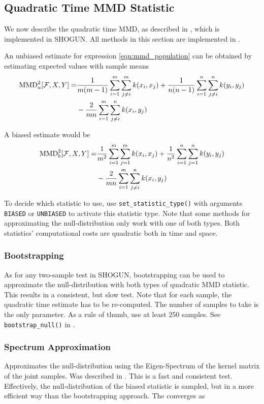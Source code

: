 \subsection{Quadratic Time MMD Statistic}
\label{sec:mmd_quadratic}
We now describe the quadratic time MMD, as described in \citep[Lemma 6]{Gretton2012}, which is implemented in SHOGUN. All methods in this section are implemented in .

An unbiased estimate for expression \ref{eqn:mmd_population} can be obtained by estimating expected values with sample means
\begin{align*}
\operatorname{MMD}_u^2[\mathcal{F},X,Y]=&\frac{1}{m(m-1)}\sum_{i=1}^m\sum_{j\neq i}^mk(x_i,x_j) + \frac{1}{n(n-1)}\sum_{i=1}^n\sum_{j\neq i}^nk(y_i,y_j)\\
&-\frac{2}{mn}\sum_{i=1}^m\sum_{j\neq i}^nk(x_i,y_j)
\end{align*}

A biased estimate would be
\begin{align*}
\operatorname{MMD}_b^2[\mathcal{F},X,Y]=&\frac{1}{m^2}\sum_{i=1}^m\sum_{j=1}^mk(x_i,x_j) + \frac{1}{n^ 2}\sum_{i=1}^n\sum_{j=1}^nk(y_i,y_j)\\
&-\frac{2}{mn}\sum_{i=1}^m\sum_{j\neq i}^nk(x_i,y_j)
\end{align*}

To decide which statistic to use, use \texttt{set\_statistic\_type()} with arguments \texttt{BIASED} or \texttt{UNBIASED} to activate this statistic type. Note that some methods for approximating the null-distribution only work with one of both types. Both statistics' computational costs are quadratic both in time and space.

\subsubsection{Bootstrapping}
As for any two-sample test in SHOGUN, bootstrapping can be used to approximate the null-distribution with both types of quadratic MMD statistic. This results in a consistent, but slow test. Note that for each sample, the quadratic time estimate has to be re-computed. The number of samples to take is the only parameter. As a rule of thumb, use at least 250 samples.
See \texttt{bootstrap\_null()} in .

\subsubsection{Spectrum Approximation}
Approximates the null-distribution using the Eigen-Spectrum of the kernel matrix of the joint samples. Was described in \citep{Gretton2012b}. This is a fast and consistent test. Effectively, the null-distribution of the biased statistic is sampled, but in a more efficient way than the bootstrapping approach. The converges as

